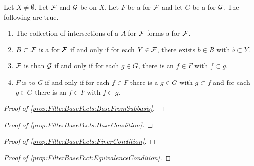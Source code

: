 \begin{prop}
\label{prop:FilterBaseFacts}
   Let $X \neq \emptyset$. 
   Let $\mathcal{F}$ and $\mathcal{G}$ be \Filters on $X$. 
   Let $F$ be a \FilterBase for $\mathcal{F}$ and let 
   $G$ be a \FilterBase for $\mathcal{G}$. 
   The following are true. 
   \begin{enumerate}[label=(\roman*), ref={\ref{prop:FilterBaseFacts}.~\roman*}]
    \item \label{prop:FilterBaseFacts:BaseFromSubbasis}
        The collection of \Finite intersections of a 
        \FilterSubbasis $A$ for $\mathcal{F}$ 
        forms a \FilterBase for $\mathcal{F}$. 
    \item \label{prop:FilterBaseFacts:BaseCondition}
    $B \subset \mathcal{F}$ is a \FilterBase for $\mathcal{F}$ 
    if and only if for each $Y \in \mathcal{F}$, there exists
    $b \in B$ with $b \subset Y$. 
    \item \label{prop:FilterBaseFacts:FinerCondition}
       $\mathcal{F}$ 
       is \FinerFilter than $\mathcal{G}$ if and only if
       for each $g \in G$, there is an $f \in F$ with $f \subset g$. 
    \item  \label{prop:FilterBaseFact:EquivalenceCondition} 
    $F$ is 
    \FilterBaseEquivalent to 
    $G$ if and only if for each 
    $f \in F$ there  is a 
    $g \in G$ with $g \subset f$ 
    and for each $g \in G$ there is an 
    $f \in F$ with $f \subset g$. 
   \end{enumerate}
   \begin{proof}[Proof of \ref{prop:FilterBaseFacts:BaseFromSubbasis}]
   \end{proof}
   \begin{proof}[Proof of \ref{prop:FilterBaseFacts:BaseCondition}]
   \end{proof}
   \begin{proof}[Proof of \ref{prop:FilterBaseFacts:FinerCondition}]
   \end{proof}
   \begin{proof}[Proof of \ref{prop:FilterBaseFact:EquivalenceCondition}]
   \end{proof}
\end{prop}
